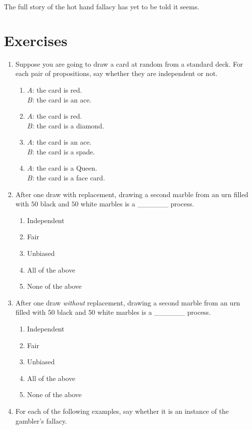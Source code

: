 \documentclass[justified]{tufte-book}
\providecommand{\tightlist}{%
  \setlength{\itemsep}{0pt}\setlength{\parskip}{0pt}}
\theoremstyle{definition}
\theoremstyle{definition}
\theoremstyle{definition}
\theoremstyle{remark}
\begin{document}
The full story of the hot hand fallacy has yet to be told it seems.

\hypertarget{exercises-3}{%
\section*{Exercises}\label{exercises-3}}

\begin{enumerate}
\item
  Suppose you are going to draw a card at random from a standard deck.
  For each pair of propositions, say whether they are independent or
  not.

  \begin{enumerate}
  \def\labelenumii{\alph{enumii}.}
  \item
    \(A\): the card is red.\\
    \(B\): the card is an ace.
  \item
    \(A\): the card is red.\\
    \(B\): the card is a diamond.
  \item
    \(A\): the card is an ace.\\
    \(B\): the card is a spade.
  \item
    \(A\): the card is a Queen.\\
    \(B\): the card is a face card.
  \end{enumerate}
\item
  After one draw with replacement, drawing a second marble from an urn
  filled with \(50\) black and \(50\) white marbles is a \_\_\_\_\_\_
  process.

  \begin{enumerate}
  \def\labelenumii{\alph{enumii}.}
  \tightlist
  \item
    Independent
  \item
    Fair
  \item
    Unbiased
  \item
    All of the above
  \item
    None of the above
  \end{enumerate}
\item
  After one draw \emph{without} replacement, drawing a second marble
  from an urn filled with \(50\) black and \(50\) white marbles is a
  \_\_\_\_\_\_ process.

  \begin{enumerate}
  \def\labelenumii{\alph{enumii}.}
  \tightlist
  \item
    Independent
  \item
    Fair
  \item
    Unbiased
  \item
    All of the above
  \item
    None of the above
  \end{enumerate}
\item
  For each of the following examples, say whether it is an instance of
  the gambler's fallacy.


\end{enumerate}
\end{document}
